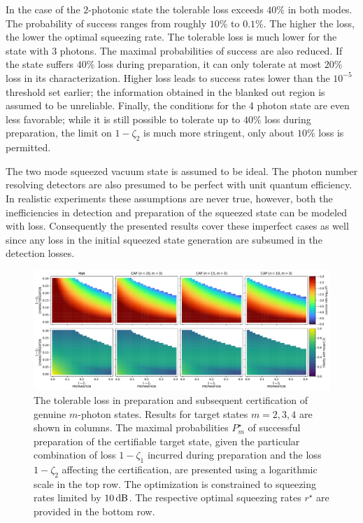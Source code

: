 \documentclass{article}
\begin{document}
In the case of the $2$-photonic state the tolerable loss exceeds $40\%$ in both modes. The probability of success ranges from roughly $10\%$ to $0.1\%$. The higher the loss, the lower the optimal squeezing rate. The tolerable loss is much lower for the state with $3$ photons. The maximal probabilities of success are also reduced. If the state suffers $40\%$ loss during preparation, it can only tolerate at most $20\%$ loss in its characterization. Higher loss leads to success rates lower than the $10^{-5}$ threshold  set earlier; the information obtained in the blanked out region is assumed to be unreliable. Finally, the conditions for the 4 photon state are even less favorable; while it is still possible to tolerate up to $40\%$ loss during preparation, the limit on $1 - \zeta_{2}$ is much more stringent, only about $10\%$ loss is permitted.

The two mode squeezed vacuum state is assumed to be ideal. The photon number resolving detectors are also presumed to be perfect with unit quantum efficiency. In realistic experiments these assumptions are never true, however, both the inefficiencies in detection and preparation of the squeezed state can be modeled with loss. Consequently the presented results cover these imperfect cases as well since any loss in the initial squeezed state generation are subsumed in the detection losses.

\begin{figure}[h]
  \begin{center}
    \includegraphics[width = \columnwidth]{import/202411/paper_unified_03.pdf}
  \end{center}
  \caption{
    The tolerable loss in preparation and subsequent certification of genuine $m$-photon states. Results for target states $m = 2, 3, 4$ are shown in columns. The maximal probabilities $P_{m}^{\star}$ of successful preparation of the certifiable target state, given the particular combination of loss $1 - \zeta_{1}$ incurred during preparation and the loss $1 - \zeta_{2}$ affecting the certification, are presented using a logarithmic scale in the top row. The optimization is constrained to squeezing rates limited by $10\,\mathrm{dB}$. The respective optimal squeezing rates $r^{\star}$ are provided in the bottom row.
  }
  \label{f-otm-3}
\end{figure}
\end{document}
